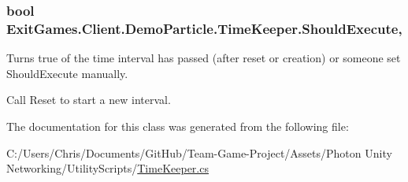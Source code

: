 \subsubsection[{\texorpdfstring{Should\+Execute}{ShouldExecute}}]{\setlength{\rightskip}{0pt plus 5cm}bool Exit\+Games.\+Client.\+Demo\+Particle.\+Time\+Keeper.\+Should\+Execute\hspace{0.3cm}{\ttfamily [get]}, {\ttfamily [set]}}\hypertarget{class_exit_games_1_1_client_1_1_demo_particle_1_1_time_keeper_aa448c3addb4ded8b0226be09bed5982c}{}\label{class_exit_games_1_1_client_1_1_demo_particle_1_1_time_keeper_aa448c3addb4ded8b0226be09bed5982c}


Turns true of the time interval has passed (after reset or creation) or someone set Should\+Execute manually. 

Call Reset to start a new interval.

The documentation for this class was generated from the following file\+:\begin{DoxyCompactItemize}
\item 
C\+:/\+Users/\+Chris/\+Documents/\+Git\+Hub/\+Team-\/\+Game-\/\+Project/\+Assets/\+Photon Unity Networking/\+Utility\+Scripts/\hyperlink{_time_keeper_8cs}{Time\+Keeper.\+cs}\end{DoxyCompactItemize}
